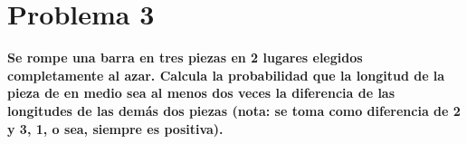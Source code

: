 \section*{Problema 3}
\textbf{Se rompe una barra en tres piezas en 2 lugares elegidos completamente al azar. Calcula la probabilidad que la longitud de la pieza de en medio sea al menos dos veces la diferencia de las longitudes de las demás dos piezas (nota: se toma como diferencia de 2 y 3, 1, o sea, siempre es positiva).}